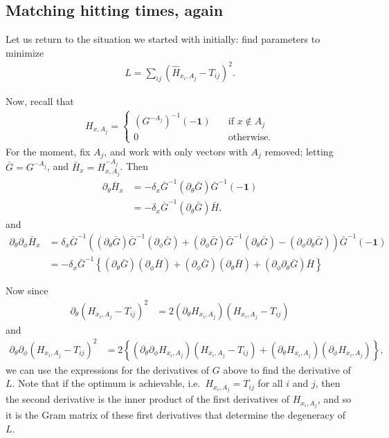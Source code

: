 \documentclass{article}
\newcommand{\bone}{\mathbf{1}}
\begin{document}
\subsection{Matching hitting times, again}

Let us return to the situation we started with initially:
find parameters to minimize
\begin{align}
  L = \sum_{ij} \left( \hat H_{x_i,A_j} - T_{ij} \right)^2 .
\end{align}

Now, recall that
\begin{align}
  H_{x,A_j} = \begin{cases}
    (G^{-A_j})^{-1} (-\bone) \quad & \text{if } x \notin A_j \\
    0 \quad & \text{otherwise.}
  \end{cases}
\end{align}
For the moment, fix $A_j$, and work with only vectors with $A_j$ removed;
letting $\bar G = G^{-A_j}$, and $\bar H_x = H_{x,A_j}^{-A_j}$.
Then
\begin{align}
  \partial_\theta \bar H_x 
  &= - \delta_x \bar G^{-1} (\partial_\theta \bar G) \bar G^{-1} (-\bone) \\
  &= - \delta_x \bar G^{-1} (\partial_\theta \bar G) \bar H ,
\end{align}
and
\begin{align}
  \partial_\theta \partial_\phi \bar H_x 
    &= \delta_x \bar G^{-1} \left( 
    (\partial_\theta \bar G) \bar G^{-1} (\partial_\phi \bar G)
    + (\partial_\phi \bar G) \bar G^{-1} (\partial_\theta \bar G)
    - (\partial_\phi \partial_\theta \bar G)
    \right) \bar G^{-1} (-\bone) \\
    &= - \delta_x \bar G^{-1} \left\{
    (\partial_\theta \bar G) ( \partial_\phi \bar H ) 
    + (\partial_\phi \bar G) ( \partial_\theta \bar H )
    + (\partial_\phi \partial_\theta \bar G) \bar H
    \right\}
\end{align}

Now since
\begin{align}
  \partial_\theta (H_{x_i,A_j} - T_{ij})^2 
    &= 2 ( \partial_\theta H_{x_i,A_j} )(H_{x_i,A_j} - T_{ij})
\end{align}
and
\begin{align}
  \partial_\theta \partial_\phi (H_{x_i,A_j} - T_{ij})^2 
    &= 2 \left\{
    ( \partial_\theta \partial_\phi H_{x_i,A_j} )(H_{x_i,A_j} - T_{ij})
    + ( \partial_\theta H_{x_i,A_j} ) ( \partial_\phi H_{x_i,A_j} ) \right\} ,
\end{align}
we can use the expressions for the derivatives of $G$ above to find the derivative of $L$.
Note that if the optimum is achievable, i.e.\ $H_{x_i,A_j} = T_{ij}$ for all $i$ and $j$, 
then the second derivative is the inner product of the first derivatives of $H_{x_i,A_j}$,
and so it is the Gram matrix of these first derivatives that determine the degeneracy of $L$.
\end{document}
